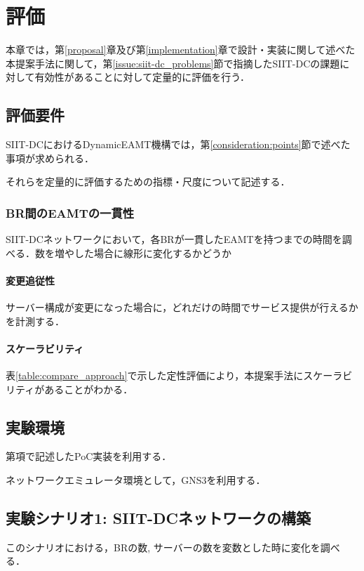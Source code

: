 \chapter{評価}
\label{evaluation}
本章では，第\ref{proposal}章及び第\ref{implementation}章で設計・実装に関して述べた本提案手法に関して，第\ref{issue:siit-dc_problems}節で指摘したSIIT-DCの課題に対して有効性があることに対して定量的に評価を行う．



\section{評価要件}
SIIT-DCにおけるDynamicEAMT機構では，第\ref{consideration:points}節で述べた事項が求められる．

それらを定量的に評価するための指標・尺度について記述する．


\subsection{BR間のEAMTの一貫性}
SIIT-DCネットワークにおいて，各BRが一貫したEAMTを持つまでの時間を調べる．数を増やした場合に線形に変化するかどうか

\subsubsection{変更追従性}
サーバー構成が変更になった場合に，どれだけの時間でサービス提供が行えるかを計測する．

\subsubsection{スケーラビリティ}
表\ref{table:compare_approach}で示した定性評価により，本提案手法にスケーラビリティがあることがわかる．


\section{実験環境}
第\label{implementation:poc}項で記述したPoC実装を利用する．

ネットワークエミュレータ環境として，GNS3を利用する．



\section{実験シナリオ1: SIIT-DCネットワークの構築}
このシナリオにおける，BRの数, サーバーの数を変数とした時に変化を調べる．

